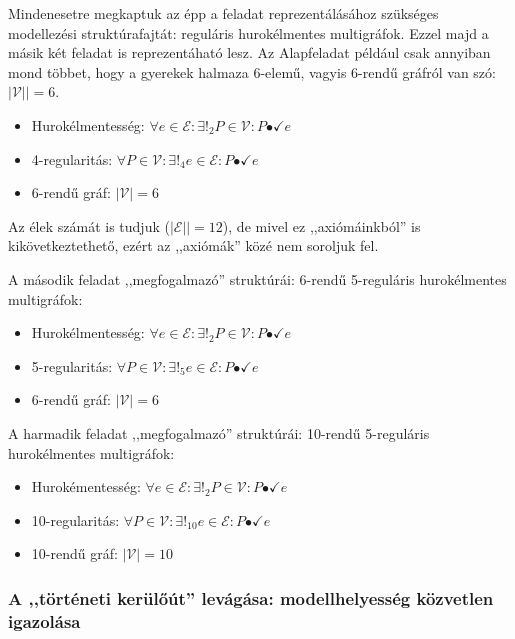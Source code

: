 \documentclass{article}
\newcommand{\incidsymbol}{\bullet\!\!\!\checkmark}
\newcommand{\incid}{\mathrel{\incidsymbol}} %
\begin{document}
	Mindenesetre megkaptuk az épp a feladat reprezentálásához szükséges modellezési struktúrafajtát: reguláris hurokélmentes multigráfok. Ezzel majd a másik két feladat is reprezentáható lesz. Az Alapfeladat például csak annyiban mond többet, hogy a gyerekek halmaza 6-elemű, vagyis 6-rendű gráfról van szó: $\left|\mathcal V|\right| = 6$.

	\begin{itemize}
		\item
		Hurokélmentesség: $\forall e \in \mathcal E: \exists!_2 P \in \mathcal V: P \incid e$ 
		\item
		4-regularitás: $\forall P \in \mathcal V: \exists!_4 e \in \mathcal E: P  \incid e$
		\item
		6-rendű gráf: $\left|\mathcal V\right| = 6$
	\end{itemize}

	Az élek számát is tudjuk ($\left|\mathcal E|\right| = 12$), de mivel ez ,,axiómáinkból'' is kikövetkeztethető, ezért az ,,axiómák'' közé nem soroljuk fel.

	A második feladat ,,megfogalmazó'' struktúrái: 6-rendű 5-reguláris hurokélmentes multigráfok:
	\begin{itemize}
		\item
		Hurokélmentesség: $\forall e \in \mathcal E: \exists!_2 P \in \mathcal V: P \incid e$
		\item
		5-regularitás: $\forall P \in \mathcal V: \exists!_5 e \in \mathcal E: P  \incid e$
		\item
		6-rendű gráf: $\left|\mathcal V\right| = 6$
	\end{itemize}


	A harmadik feladat ,,megfogalmazó'' struktúrái: 10-rendű 5-reguláris hurokélmentes multigráfok:
	\begin{itemize}
		\item
		Hurokémentesség: $\forall e \in \mathcal E: \exists!_2 P \in \mathcal V: P \incid e$
		\item
		10-regularitás: $\forall P \in \mathcal V: \exists!_{10} e \in \mathcal E: P  \incid e$
		\item
		10-rendű gráf: $\left|\mathcal V\right| = 10$
	\end{itemize}


	\subsubsection{A ,,történeti kerülőút'' levágása: modellhelyesség közvetlen igazolása}
\end{document}
